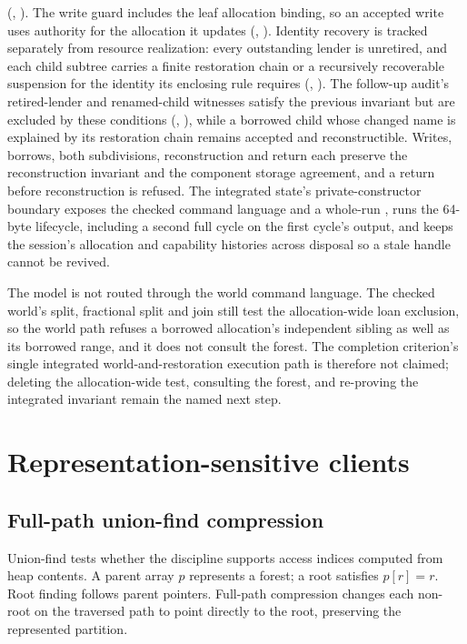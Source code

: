 \documentclass[a4paper,UKenglish,cleveref]{lipics-v2021}
\begin{document}
(, ). The write guard includes
the leaf allocation binding, so an accepted write uses authority for the
allocation it updates (, ).
Identity recovery is tracked separately from resource realization: every
outstanding lender is unretired, and each child subtree carries a finite
restoration chain or a recursively recoverable suspension for the identity its
enclosing rule requires (, ).
The follow-up audit's retired-lender and renamed-child witnesses satisfy the
previous invariant but are excluded by these conditions
(, ), while a
borrowed child whose changed name is explained by its restoration chain remains
accepted and reconstructible. Writes,
borrows, both subdivisions, reconstruction and return each preserve the
reconstruction invariant and the component storage agreement, and a return before
reconstruction is refused. The integrated state's private-constructor boundary
exposes the checked command language and a whole-run , runs the
64-byte lifecycle, including a second full cycle on the first cycle's output, and
keeps the session's allocation and capability histories across disposal so a
stale handle cannot be revived.

The model is not routed through the world command language. The checked world's
split, fractional split and join still test the allocation-wide loan exclusion,
so the world path refuses a borrowed allocation's independent sibling as well as
its borrowed range, and it does not consult the forest. The completion
criterion's single integrated world-and-restoration execution path is therefore
not claimed; deleting the allocation-wide test, consulting the forest, and
re-proving the integrated invariant remain the named next step.

\section{Representation-sensitive clients}
\label{sec:clients}

\subsection{Full-path union-find compression}

Union-find tests whether the discipline supports access indices computed from
heap contents. A parent array $p$ represents a forest; a root satisfies
$p[r]=r$. Root finding follows parent pointers. Full-path compression changes
each non-root on the traversed path to point directly to the root, preserving
the represented partition.
\end{document}
